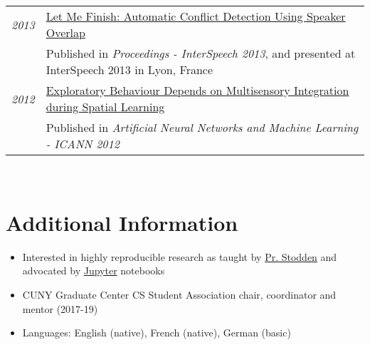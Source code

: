 \documentclass[a4paper,10pt]{article}
\begin{document}
\begin{tabular}{rp{14cm}}
        \emph{2013} & \href{https://grezesf.github.io/papers/2013-03_LetMeFinish.pdf}{Let Me Finish: Automatic Conflict Detection Using Speaker Overlap}\\
        & \small{Published in {\em Proceedings - InterSpeech 2013}, and presented at InterSpeech 2013 in Lyon, France}
        \vspace{0.15cm} \\

        \emph{2012} & \href{https://grezesf.github.io/papers/2012-Exploratory_Behaviour_Depends_on_Multisensory_Integration_during_Spatial_Learning.pdf}{Exploratory Behaviour Depends on Multisensory Integration during Spatial Learning}\\
        & \small{Published in {\em Artificial Neural Networks and Machine Learning - ICANN 2012}}
    \end{tabular}\\

\section{Additional Information}
    \vspace{0.2cm}
    \begin{itemize}
        \item Interested in highly reproducible research as taught by \href{http://stodden.net}{Pr. Stodden} and advocated by \href{https://jupyter.org/}{Jupyter} notebooks
        \item CUNY Graduate Center CS Student Association chair, coordinator and mentor (2017-19) 
        \item Languages: English (native), French (native), German (basic) 
    \end{itemize}
\end{document}
